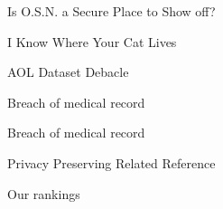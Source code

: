 \documentclass[
 size=14pt,
 paper=smartboard,  %
 mode=present, 		%
 display=slides, 	%
 style=tuliplab,  	%
 pauseslide,
 fleqn,leqno]{powerdot}
\begin{document}
\begin{slide}[toc=,bm=]{Is O.S.N. a Secure Place to Show off?}


\end{slide}


\begin{slide}[toc=,bm=]{I Know Where Your Cat Lives}


\end{slide}


\begin{slide}[toc=,bm=]{AOL Dataset Debacle}


\end{slide}


\begin{slide}[toc=,bm=]{Breach of medical record}


\end{slide}


\begin{slide}[toc=,bm=]{Breach of medical record}


\end{slide}


\begin{slide}[toc=,bm=]{Privacy Preserving Related Reference}


\end{slide}


\begin{slide}[toc=,bm=]{Our rankings}


\end{slide}
\end{document}
